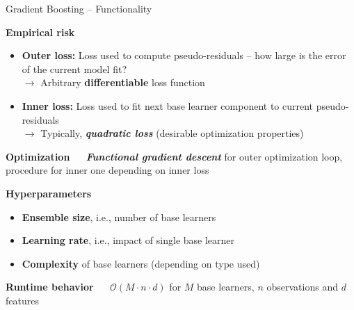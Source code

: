 \documentclass[11pt,compress,t,notes=noshow, xcolor=table]{beamer}
\newcommand{\bfit}[1]{\textbf{\textit{#1}}}
\newcommand{\highlight}[1]{\textcolor{highlightcol}{\textbf{#1}}}
\begin{document}
\begin{frame}{Gradient Boosting -- Functionality}

\footnotesize

\highlight{Empirical risk}

\begin{itemize}
  \item \textbf{Outer loss:} Loss used to compute pseudo-residuals -- how large 
  is the error of the current model fit? \\
  $\rightarrow$ Arbitrary \textbf{differentiable} loss function
  \item \textbf{Inner loss:} Loss used to fit next base learner component to 
  current pseudo-residuals \\
  $\rightarrow$ Typically, \bfit{quadratic loss} (desirable 
  optimization properties)
\end{itemize}

\medskip

\highlight{Optimization} ~~ \bfit{Functional gradient descent} for outer 
optimization loop, procedure for inner one depending on inner loss

\medskip

\highlight{Hyperparameters}

\begin{itemize}
  \item \textbf{Ensemble size}, i.e., number of base learners
  \item \textbf{Learning rate}, i.e., impact of single base learner
  \item \textbf{Complexity} of base learners (depending on type used)
\end{itemize}

\medskip

\highlight{Runtime behavior} ~~ $\mathcal{O}(M \cdot n \cdot d)$ 
for $M$ base learners, $n$ observations and $d$ features

\end{frame}

\end{document}
